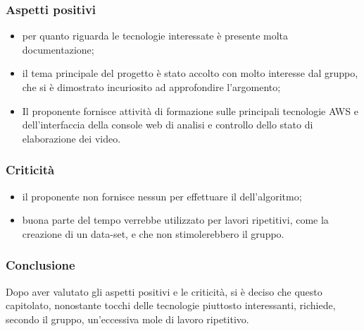     \subsubsection{Aspetti positivi}
    \begin{itemize}
    		\item per quanto riguarda le tecnologie interessate è presente molta documentazione;
    		\item il tema principale del progetto è stato accolto con molto interesse dal gruppo, che si è dimostrato incuriosito ad approfondire l'argomento;
    		 \item Il proponente fornisce attività di formazione sulle principali tecnologie AWS e  dell'interfaccia della console web di analisi e controllo dello stato di elaborazione dei video.
    \end{itemize}
    \subsubsection{Criticità}
    \begin{itemize}
    		\item il proponente non fornisce nessun  per effettuare il  dell'algoritmo;
    		\item buona parte del tempo verrebbe utilizzato per lavori ripetitivi, come la creazione di un data-set, e che non stimolerebbero il gruppo.
    \end{itemize}

    \subsubsection{Conclusione}
	Dopo aver valutato gli aspetti positivi e le criticità, si è deciso che questo capitolato, nonostante tocchi delle tecnologie piuttosto interessanti, richiede, secondo il gruppo, un'eccessiva mole di lavoro ripetitivo.
